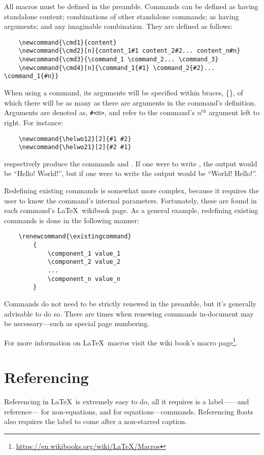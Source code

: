 All macros must be defined in the preamble.  Commands can be defined
as having standalone content; combinations of other standalone
commands; as having arguments; and any imaginable combination. They
are defined as follows:
\begin{verbatim}
	\newcommand{\cmd1}{content}
	\newcommand{\cmd2}[n]{content_1#1 content_2#2... content_n#n}
	\newcommand{\cmd3}{\command_1 \command_2... \command_3}
	\newcommand{\cmd4}[n]{\command_1{#1} \command_2{#2}... \command_1{#n}}
\end{verbatim}
When using a command, its arguments will be specified within braces,
\{\}, of which there will be as many as there are arguments in the
command's definition. Arguments are denoted as, \verb|#<n>|, and refer
to the command's $n^{\text{th}}$ argument left to right.  For
instance:
\begin{verbatim}
	\newcommand{\helwo12}[2]{#1 #2}
	\newcommand{\helwo21}[2]{#2 #1}
\end{verbatim}
respectively produce the commands  and
.  If one were to write
, the output would be ``Hello!
World!'', but if one were to write  the
output would be ``World! Hello!''.

Redefining existing commands is somewhat more complex, because it
requires the user to know the command's internal parameters.
Fortunately, these are found in each command's \LaTeX~wikibook page.
As a general example, redefining existing commands is done in the
following manner:
\begin{verbatim}
	\renewcommand{\existingcommand}
	    {
	        \component_1 value_1
	        \component_2 value_2
	        ...
	        \component_n value_n
	    }
\end{verbatim}
Commands do not need to be strictly renewed in the preamble, but it's
generally advisable to do so.  There are times when renewing commands
in-document may be necessary---such as special page numbering.

For more information on \LaTeX~macros visit the wiki book's macro
page\footnote{\url{https://en.wikibooks.org/wiki/LaTeX/Macros}}.
%
\section{Referencing}
%
Referencing in \LaTeX~is extremely easy to do, all it requires is a
label------and reference--- for
non-equations, and  for
equations---commands.  Referencing floats also requires the label to
come after a non-starred caption.

